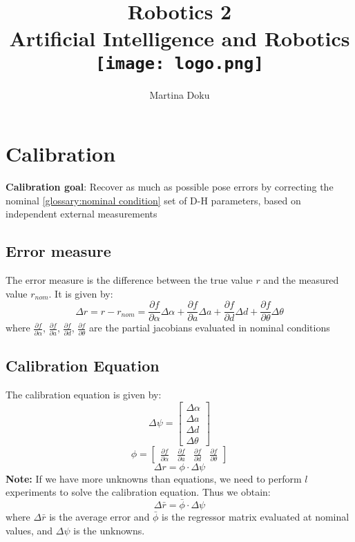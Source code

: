 \documentclass[a4paper,12pt]{article}
\title{
    \Huge{Robotics 2}\\
    \large{Artificial Intelligence and Robotics}\\
    \vspace{1cm}
    \texttt{[image: logo.png]}
}
\author{Martina Doku}
\begin{document}
\maketitle
\newpage

\tableofcontents
\newpage

\section{Calibration}
\textbf{Calibration goal}:  Recover as 
much as possible pose
errors by correcting the nominal \ref{glossary:nominal condition}
set of D-H parameters,
based on independent external measurements
\subsection{Error measure}
The error measure is the difference between the true value $r$ and the
 measured value $r_{nom}$. It is given by:
\begin{equation}
  \Delta r = r - r_{nom} = \frac{\partial f}{\partial \alpha} \Delta \alpha + \frac{\partial f}{\partial a} \Delta a + \frac{\partial f}{\partial d} \Delta d + \frac{\partial f}{\partial \theta} \Delta \theta
\end{equation}
where $\frac{\partial f}{\partial \alpha}$, $\frac{\partial f}{\partial a}$, $\frac{\partial f}{\partial d}$, $\frac{\partial f}{\partial \theta}$ are the partial 
jacobians evaluated in nominal conditions
\subsection{Calibration Equation}
The calibration equation is given by:
\begin{equation}
    \Delta \psi = \begin{bmatrix}
        \Delta \alpha \\
        \Delta a \\
        \Delta d \\
        \Delta \theta
    \end{bmatrix}
\end{equation}
\begin{equation}
    \phi= \begin{bmatrix}
     \frac{\partial f}{\partial \alpha} & \frac{\partial f}{\partial a} & \frac{\partial f}{\partial d} & \frac{\partial f}{\partial \theta}
    \end{bmatrix}
\end{equation}
\begin{equation}
    \Delta r= \phi \cdot \Delta \psi
\end{equation}
\textbf{Note:} If we have more unknowns than equations, we need to perform 
$l$ experiments to solve the calibration equation. Thus we obtain:
\begin{equation}
    \Delta \bar{r}= \bar{\phi} \cdot \Delta \psi
\end{equation}
where $\Delta \bar{r}$ is the average error 
and $\bar{\phi}$ is the regressor matrix evaluated at nominal values,
and $\Delta \psi$ is the unknowns.
\end{document}
